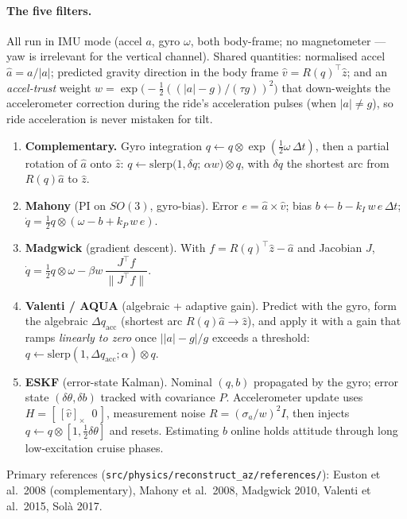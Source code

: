 \documentclass[11pt,a4paper]{article}
\newcommand{\amag}{\lvert a\rvert}
\newcommand{\ahat}{\hat{a}}
\newcommand{\zhat}{\hat{z}}
\begin{document}
\paragraph{The five filters.}
All run in IMU mode (accel $a$, gyro $\omega$, both body-frame; no
magnetometer --- yaw is irrelevant for the vertical channel). Shared
quantities: normalised accel $\ahat=a/\amag$; predicted gravity direction in
the body frame $\hat v = R(q)^\top\zhat$; and an \emph{accel-trust} weight
$w=\exp\!\big(-\tfrac12((\amag-g)/(\tau g))^2\big)$ that down-weights the
accelerometer correction during the ride's acceleration pulses (when
$\amag\neq g$), so ride acceleration is never mistaken for tilt.
\begin{enumerate}\setlength\itemsep{3pt}
  \item \textbf{Complementary.} Gyro integration
        $q\!\leftarrow\! q\otimes\exp(\tfrac12\omega\,\Delta t)$, then a
        partial rotation of $\ahat$ onto $\zhat$:
        $q\leftarrow \mathrm{slerp}\big(1,\delta q;\,\alpha w\big)\otimes q$,
        with $\delta q$ the shortest arc from $R(q)\ahat$ to $\zhat$.
  \item \textbf{Mahony} (PI on $SO(3)$, gyro-bias). Error
        $e=\ahat\times\hat v$; bias $b\leftarrow b-k_I\,w\,e\,\Delta t$;
        $\dot q=\tfrac12 q\otimes(\omega-b+k_P\,w\,e)$.
  \item \textbf{Madgwick} (gradient descent). With
        $f=R(q)^\top\zhat-\ahat$ and Jacobian $J$,
        $\dot q=\tfrac12 q\otimes\omega-\beta w\,\dfrac{J^\top f}{\lVert J^\top f\rVert}$.
  \item \textbf{Valenti / AQUA} (algebraic + adaptive gain). Predict with
        the gyro, form the algebraic $\Delta q_{\mathrm{acc}}$ (shortest arc
        $R(q)\ahat\!\to\!\zhat$), and apply it with a gain that ramps
        \emph{linearly to zero} once $\lvert\amag-g\rvert/g$ exceeds a
        threshold: $q\leftarrow\mathrm{slerp}(1,\Delta q_{\mathrm{acc}};\alpha)\otimes q$.
  \item \textbf{ESKF} (error-state Kalman). Nominal $(q,b)$ propagated by the
        gyro; error state $(\delta\theta,\delta b)$ tracked with covariance
        $P$. Accelerometer update uses $H=[\,[\hat v]_\times\;\; 0\,]$,
        measurement noise $R=(\sigma_a/w)^2 I$, then injects
        $q\leftarrow q\otimes[1,\tfrac12\delta\theta]$ and resets. Estimating
        $b$ online holds attitude through long low-excitation cruise phases.
\end{enumerate}
Primary references (\texttt{src/physics/reconstruct\_az/references/}):
Euston et al.\ 2008 (complementary), Mahony et al.\ 2008, Madgwick 2010,
Valenti et al.\ 2015, Sol\`a 2017.
\end{document}
